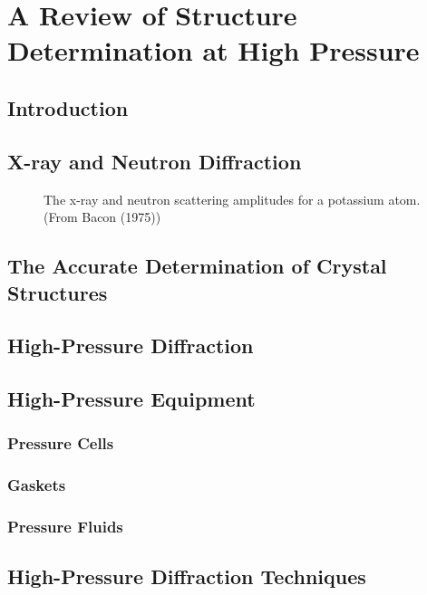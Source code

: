 \chapter{A Review of Structure Determination at High Pressure}

\section{Introduction}

\section{X-ray and Neutron Diffraction}

\begin{figure}
\vspace{8cm}
\caption{The x-ray and neutron scattering amplitudes for a potassium atom. (From
Bacon (1975))}
\end{figure}


\section{The Accurate Determination of Crystal Structures}

\section{High-Pressure Diffraction}

\section{High-Pressure Equipment}

\subsection{Pressure Cells}

\subsection{Gaskets}

\subsection{Pressure Fluids}

\section{High-Pressure Diffraction Techniques}

